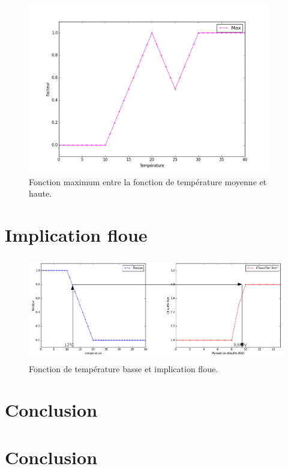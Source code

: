\documentclass[a4paper,11pt]{article}
\begin{document}
\begin{figure}[H]
  \begin{center}
  \includegraphics[height=280px]{images/max.png}
  \caption{Fonction maximum entre la fonction de température moyenne et haute.}
  \end{center}
\end{figure}



\section{Implication floue}

\begin{figure}[H]
  \begin{center}
  \includegraphics[height=170px]{images/low_mamdani_arrow.png}
  \caption{Fonction de température basse et implication floue.}
  \end{center}
\end{figure}




\section*{Conclusion}

\newpage





\section*{Conclusion}
\end{document}
